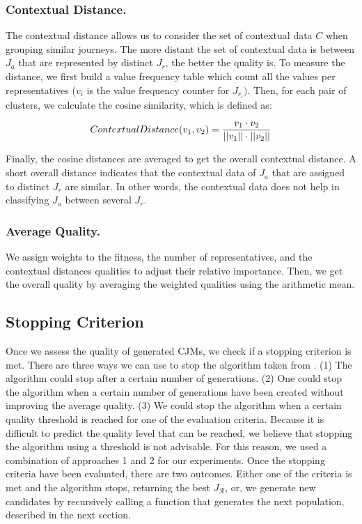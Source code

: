 \documentclass[runningheads]{llncs}
\begin{document}
\label{contextual-distance}
\subsubsection{Contextual Distance.} The contextual distance allows us to consider the set of contextual data $C$ when grouping similar journeys. The more distant the set of contextual data is between $J_a$ that are represented by distinct $J_r$, the better the quality is. To measure the distance, we first build a value frequency table which count all the values per representatives (${v_i}$ is the value frequency counter for $J_{r_i})$. Then, for each pair of clusters, we calculate the cosine similarity, which is defined as:

\begin{equation}
\footnotesize
    ContextualDistance({v_{1}}, {v_{2}}) = \frac{v_{1} \cdot v_{2}}{||v_{1} ||\cdot||v_{2}||} 
\end{equation}

Finally, the cosine distances are averaged to get the overall contextual distance. A short overall distance indicates that the contextual data of $J_a$ that are assigned to distinct $J_r$ are similar. In other words, the contextual data does not help in classifying $J_a$ between several $J_r$. 

\subsubsection{Average Quality. } We assign weights to the fitness, the number of representatives, and the contextual distances qualities to adjust their relative importance. Then, we get the overall quality by averaging the weighted qualities using the arithmetic mean. 

\subsection{Stopping Criterion}
{Once we assess the quality of generated CJMs, we check if a stopping criterion is met.} There are three ways we can use to stop the algorithm taken from \cite{buijs2012genetic,de2005genetic}. (1) The algorithm could stop after a certain number of generations. (2) One could stop the algorithm when a certain number of generations have been created without improving the average quality. (3) We could stop the algorithm when a certain quality threshold is reached for one of the evaluation criteria. Because it is difficult to predict the quality level that can be reached, we believe that stopping the algorithm using a threshold is not advisable. For this reason, we used a combination of approaches 1 and 2 for our experiments. Once the stopping criteria have been evaluated, there are two outcomes. Either one of the criteria is met and the algorithm stops, returning the best $J_{\mathcal{R}}$, or, {we generate new candidates} by recursively calling a function that generates the next population, described in the next section.
\end{document}
